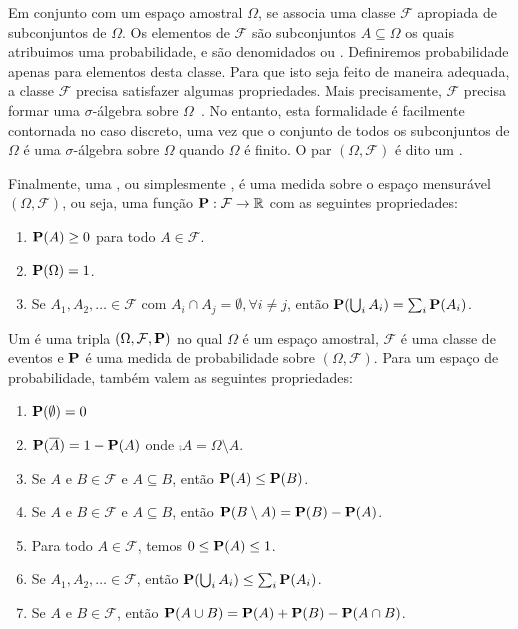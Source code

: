 Em conjunto com um espaço amostral $\Omega$, se associa uma classe $\mathcal{F}$ apropiada de subconjuntos de $\Omega$. Os elementos de $\mathcal{F}$ são subconjuntos $A \subseteq \Omega$ os quais atribuimos uma probabilidade, e são denomidados  ou . Definiremos probabilidade apenas para elementos desta classe. Para que isto seja feito de maneira adequada, a classe $\mathcal{F}$ precisa satisfazer algumas propriedades. Mais precisamente, $\mathcal{F}$ precisa formar uma $\sigma$-álgebra sobre $\Omega$~\cite{barryjames}.
No entanto, esta formalidade é facilmente contornada no caso discreto, uma vez que o conjunto de todos os subconjuntos de $\Omega$ é uma $\sigma$-álgebra sobre $\Omega$ quando $\Omega$ é finito. O par $(\Omega, \mathcal{F})$ é dito um .

Finalmente, uma , ou simplesmente , é uma medida sobre o espaço mensurável $(\Omega, \mathcal{F})$, ou seja, uma função $\operatorname{\mathbf{P}} : \mathcal{F} \to \mathbb{R}$ com as seguintes propriedades:

\begin{enumerate}[label=(P\arabic*),itemindent=*]
  \item $\operatorname{\mathbf{P}}(A) \geq 0$ para todo $A \in \mathcal{F}$.
  \item $\operatorname{\mathbf{P}}(\Omega) = 1$.
  \item Se $A_1, A_2, \dots \in \mathcal{F}$ com $A_i \cap A_j = \emptyset, \forall i \neq j$, então $\operatorname{\mathbf{P}}( \bigcup_{i} A_i ) = \sum_i \operatorname{\mathbf{P}}(A_i)$.
\end{enumerate}

Um  é uma tripla $(\Omega, \mathcal{F}, \operatorname{\mathbf{P}})$ no qual $\Omega$ é um espaço amostral, $\mathcal{F}$ é uma classe de eventos e $\operatorname{\mathbf{P}}$ é uma medida de probabilidade sobre $(\Omega, \mathcal{F})$. Para um espaço de probabilidade, também valem as seguintes propriedades:

\begin{enumerate}[label=\arabic*.,itemindent=*]
  \item $\operatorname{\mathbf{P}}(\emptyset) = 0$
  \item $\operatorname{\mathbf{P}}(\overline{A}) = 1 - \operatorname{\mathbf{P}}(A)$ onde $\comp{A} = \Omega \setminus A$.
  \item Se $A$ e $B \in \mathcal{F}$ e $A \subseteq B$, então $\operatorname{\mathbf{P}}(A) \leq \operatorname{\mathbf{P}}(B)$.
  \item Se $A$ e $B \in \mathcal{F}$ e $A \subseteq B$, então $\operatorname{\mathbf{P}}(B \setminus A) = \operatorname{\mathbf{P}}(B) - \operatorname{\mathbf{P}}(A)$.
  \item Para todo $A \in \mathcal{F}$, temos $0 \leq \operatorname{\mathbf{P}}(A) \leq 1$.
  \item Se $A_1, A_2, \dots \in \mathcal{F}$, então $\operatorname{\mathbf{P}}( \bigcup_{i} A_i ) \leq \sum_i \operatorname{\mathbf{P}}(A_i)$.
  \item Se $A$ e $B \in \mathcal{F}$, então $\operatorname{\mathbf{P}}(A \cup B) = \operatorname{\mathbf{P}}(A) + \operatorname{\mathbf{P}}(B) - \operatorname{\mathbf{P}}(A \cap B)$.
\end{enumerate}

